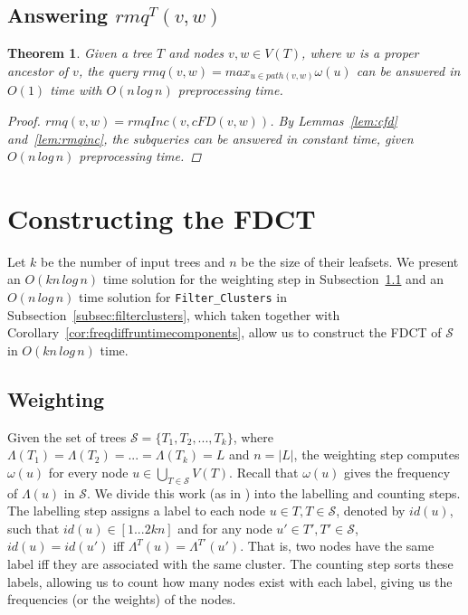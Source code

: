 \documentclass{article}
\newcommand{\leafset}{\Lambda}
\newcommand{\weight}{\omega}
\newtheorem{rmqstructure}[incompatibility]{Theorem}
\begin{document}
    \subsection{Answering $rmq^T(v, w)$}

    \begin{rmqstructure}
        \label{theorem:rmqstructure}
        Given a tree $T$ and nodes $v, w \in V(T)$, where $w$ is a proper ancestor of $v$, the query $rmq(v, w) = max_{u \in path(v, w)}\weight(u)$ can be answered in $O(1)$ time with $O(n\,log\,n)$ preprocessing time.

        \begin{proof}
            $rmq(v, w) = rmqInc(v, cFD(v, w))$. By Lemmas~\ref{lem:cfd} and~\ref{lem:rmqinc}, the subqueries can be answered in constant time, given $O(n\,log\,n)$ preprocessing time.
        \end{proof}
    \end{rmqstructure}

    \section{Constructing the FDCT}
    \label{sec:freqdiffconstruction}

    Let $k$ be the number of input trees and $n$ be the size of their leafsets. We present an $O(kn\,log\,n)$ time solution for the weighting step in Subsection~\ref{subsec:weighting} and an $O(n\,log\,n)$ time solution for \texttt{Filter\_Clusters} in Subsection~\ref{subsec:filterclusters}, which taken together with Corollary~\ref{cor:freqdiffruntimecomponents}, allow us to construct the FDCT of $\mathcal{S}$ in $O(kn\,log\,n)$ time.

    \subsection{Weighting}
    \label{subsec:weighting}

    Given the set of trees $\mathcal{S} = \{T_1, T_2, ..., T_k\}$, where $\leafset(T_1) = \leafset(T_2) = ... = \leafset(T_k) = L$ and $n = |L|$, the weighting step computes $\weight(u)$ for every node $u \in \bigcup_{T \in \mathcal{S}}V(T)$. Recall that $\weight(u)$ gives the frequency of $\leafset(u)$ in $\mathcal{S}$. We divide this work (as in \cite{gawrychowski2017faster}) into the labelling and counting steps. The labelling step assigns a label to each node $u \in T, T \in \mathcal{S}$, denoted by $id(u)$, such that $id(u) \in [1 ... 2kn]$ and for any node $u' \in T', T' \in \mathcal{S}$, $id(u) = id(u')$ iff $\leafset^T(u) = \leafset^{T'}(u')$. That is, two nodes have the same label iff they are associated with the same cluster. The counting step sorts these labels, allowing us to count how many nodes exist with each label, giving us the frequencies (or the weights) of the nodes.
\end{document}
